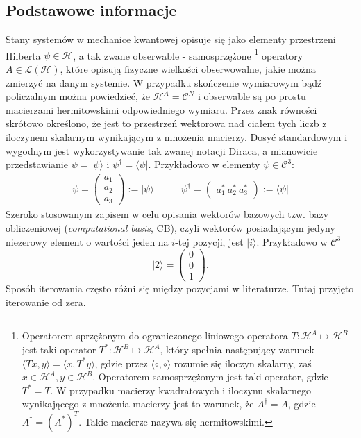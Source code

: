 \documentclass[10pt]{article} %
\newcommand{\Mats}[1]{\mathcal{L}(#1)}
\newcommand{\Hx}[1]{\mathcal{H}^{#1}}
\newcommand{\LHx}[1]{\Mats{\Hx{#1}}}
\newcommand{\Ket}[1]{|#1\rangle}
\newcommand{\Bra}[1]{\langle#1|}
\begin{document}
\subsection{Podstawowe informacje}
Stany systemów w mechanice kwantowej opisuje się jako elementy przestrzeni Hilberta $\psi \in \Hx{}$, a tak zwane obserwable - samosprzężone
\footnote{
Operatorem sprzężonym do ograniczonego liniowego operatora $T: \Hx{A} \mapsto \Hx{B}$ jest taki operator $T^*: \Hx{B} \mapsto \Hx{A}$, który spełnia następujący warunek $\langle T x,  y \rangle = \langle x,T^*  y \rangle$, gdzie przez $\langle \circ, \circ \rangle$ rozumie się iloczyn skalarny, zaś $x \in \Hx{A}, y \in \Hx{B}$. Operatorem samosprzężonym jest taki operator, gdzie $T^* = T$. W przypadku macierzy kwadratowych i iloczynu skalarnego wynikającego z mnożenia macierzy jest to warunek, że $A^\dag = A$, gdzie $A^\dag = (A^*)^T$. Takie macierze nazywa się hermitowskimi.
} operatory $A \in \LHx{}$, które opisują fizyczne wielkości obserwowalne, jakie można zmierzyć na danym systemie. W przypadku skończenie wymiarowym bądź policzalnym można powiedzieć, że $\Hx{A} = \mathcal{C}^N$ i
obserwable są po prostu macierzami hermitowskimi odpowiedniego wymiaru. Przez znak równości skrótowo określono, że jest to przestrzeń wektorowa nad ciałem tych liczb z iloczynem skalarnym wynikającym z mnożenia macierzy. Dosyć standardowym i wygodnym jest wykorzystywanie tak zwanej notacji Diraca, a mianowicie przedstawianie $\psi = \Ket{\psi}$ i $\psi^\dag = \Bra{\psi}$.
Przykładowo w elementy $\psi \in \mathcal{C}^3$:
\begin{align}
\psi = 
\begin{pmatrix}
a_1\\a_2\\a_3
\end{pmatrix}
:= \Ket{\psi}
\quad & \quad\psi^\dag = 
\begin{pmatrix}
a_1^*~a_2^*~a_3^*
\end{pmatrix}
:= \Bra{\psi}
\end{align}
Szeroko stosowanym zapisem w celu opisania wektorów bazowych tzw. bazy obliczeniowej (\textit{computational basis}, CB), czyli wektorów posiadającym jedyny niezerowy element o wartości jeden na $i$-tej pozycji, jest $\Ket{i}$.
Przykładowo w $\mathcal{C}^3$
\begin{equation}
\Ket{2} = \begin{pmatrix} 0\\0\\1 \end{pmatrix}.
\end{equation} Sposób iterowania często różni się między pozycjami w literaturze. Tutaj przyjęto iterowanie od zera.
\end{document}
